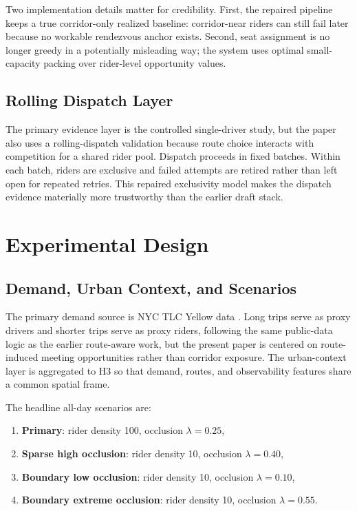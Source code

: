 \documentclass[journal]{IEEEtran}
\begin{document}
Two implementation details matter for credibility. First, the repaired pipeline keeps a true corridor-only realized baseline: corridor-near riders can still fail later because no workable rendezvous anchor exists. Second, seat assignment is no longer greedy in a potentially misleading way; the system uses optimal small-capacity packing over rider-level opportunity values.

\subsection{Rolling Dispatch Layer}
The primary evidence layer is the controlled single-driver study, but the paper also uses a rolling-dispatch validation because route choice interacts with competition for a shared rider pool. Dispatch proceeds in fixed batches. Within each batch, riders are exclusive and failed attempts are retired rather than left open for repeated retries. This repaired exclusivity model makes the dispatch evidence materially more trustworthy than the earlier draft stack.

\section{Experimental Design}
\subsection{Demand, Urban Context, and Scenarios}
The primary demand source is NYC TLC Yellow data \cite{azureyellow,azuredocs}. Long trips serve as proxy drivers and shorter trips serve as proxy riders, following the same public-data logic as the earlier route-aware work, but the present paper is centered on route-induced meeting opportunities rather than corridor exposure. The urban-context layer is aggregated to H3 so that demand, routes, and observability features share a common spatial frame.

The headline all-day scenarios are:
\begin{enumerate}
\item \textbf{Primary}: rider density 100, occlusion $\lambda=0.25$,
\item \textbf{Sparse high occlusion}: rider density 10, occlusion $\lambda=0.40$,
\item \textbf{Boundary low occlusion}: rider density 10, occlusion $\lambda=0.10$,
\item \textbf{Boundary extreme occlusion}: rider density 10, occlusion $\lambda=0.55$.
\end{enumerate}
\end{document}
